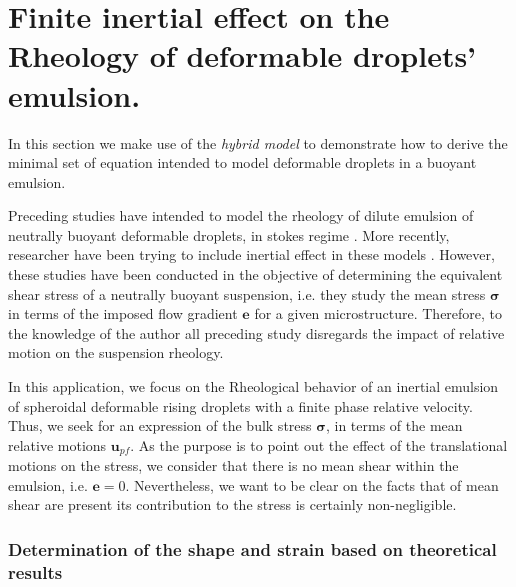 \section{
    Finite inertial effect on the Rheology of deformable droplets' emulsion.
    }

In this section we make use of the \textit{hybrid model} to demonstrate how to derive the minimal set of equation intended to model deformable droplets in a buoyant emulsion. 

Preceding studies have intended to model the rheology of dilute emulsion of neutrally buoyant deformable droplets, in stokes regime \citep{goddard1967nonlinear,lhuillier1987phenomenology,maffettone1998equation}.
More recently, researcher have been trying to include inertial effect in these models \citet{raja2010inertial,mwasame2018macroscopic}. 
However, these studies have been conducted in the objective of determining the equivalent shear stress of a neutrally buoyant suspension, i.e. they study the mean stress $\bm{\sigma}$ in terms of the imposed flow gradient $\textbf{e}$ for a given microstructure. 
Therefore, to the knowledge of the author all preceding study disregards the impact of relative motion on the suspension rheology. 

In this application, we focus on the Rheological behavior of an inertial emulsion of spheroidal deformable rising droplets with a finite phase relative velocity. 
Thus, we seek for an expression of the bulk stress $\bm{\sigma}$, in terms of the mean relative motions $\textbf{u}_{pf}$. 
As the purpose is to point out the effect of the translational motions on the stress, we consider that there is no mean shear within the emulsion, i.e. $\textbf{e} = 0$. 
Nevertheless, we want to be clear on the facts that of mean shear are present its contribution to the stress is certainly non-negligible. 

\subsubsection*{Determination of the shape and strain based on \citet{taylor1964deformation} theoretical results}

